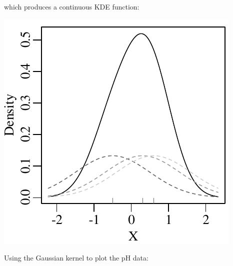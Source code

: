 \noindent which produces a continuous KDE function:\\

\noindent\begin{minipage}[t][][b]{.3\textwidth}
  \includegraphics[width=\textwidth]{../figures/gaussKDE.pdf}
\end{minipage}
\begin{minipage}[t][][t]{.7\textwidth}
\end{minipage}

Using the Gaussian kernel to plot the pH data:\\


